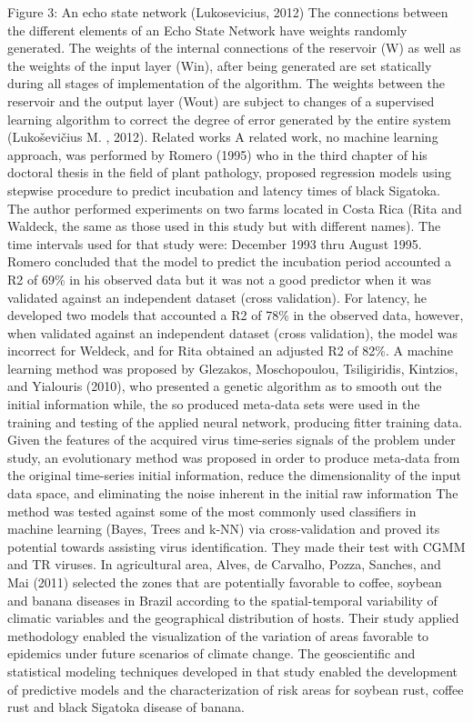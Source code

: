 \documentclass[review]{elsarticle}
\begin{document}
Figure 3: An echo state network (Lukosevicius, 2012)
The connections between the different elements of an Echo State Network have weights randomly generated. The weights of the internal connections of the reservoir (W) as well as the weights of the input layer (Win), after being generated are set statically during all stages of implementation of the algorithm. The weights between the reservoir and the output layer (Wout) are subject to changes of a supervised learning algorithm to correct the degree of error generated by the entire system (Lukoševičius M. , 2012).
Related works
A related work, no machine learning approach, was performed by Romero (1995) who in the third chapter of his doctoral thesis in the field of plant pathology, proposed regression models using stepwise procedure to predict incubation and latency times of black Sigatoka. The author performed experiments on two farms located in Costa Rica (Rita and Waldeck, the same as those used in this study but with different names). The time intervals used for that study were: December 1993 thru August 1995. Romero concluded that the model to predict the incubation period accounted a R2 of 69\% in his observed data but it was not a good predictor when it was validated against an independent dataset (cross validation). For latency, he developed two models that accounted a R2 of 78\% in the observed data, however, when validated against an independent dataset (cross validation), the model was incorrect for Weldeck, and for Rita obtained an adjusted R2 of 82\%. 
A machine learning method was proposed by Glezakos, Moschopoulou, Tsiligiridis, Kintzios, and Yialouris (2010), who presented a genetic algorithm as to smooth out the initial information while, the so produced meta-data sets were used in the training and testing of the applied neural network, producing fitter training data. Given the features of the acquired virus time-series signals of the problem under study, an evolutionary method was proposed in order to produce meta-data from the original time-series initial information, reduce the dimensionality of the input data space, and eliminating the noise inherent in the initial raw information The method was tested against some of the most commonly used classifiers in machine learning (Bayes, Trees and k-NN) via cross-validation and proved its potential towards assisting virus identification. They made their test with CGMM and TR viruses.
In agricultural area, Alves, de Carvalho, Pozza, Sanches, and Mai (2011) selected the zones that are potentially favorable to coffee, soybean and banana diseases in Brazil according to the spatial-temporal variability of climatic variables and the geographical distribution of hosts. Their study applied methodology enabled the visualization of the variation of areas favorable to epidemics under future scenarios of climate change. The geoscientific and statistical modeling techniques developed in that study enabled the development of predictive models and the characterization of risk areas for soybean rust, coffee rust and black Sigatoka disease of banana.
\end{document}
